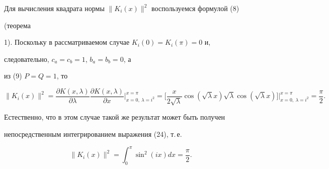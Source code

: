\begin{exam}
 


Для вычисления квадрата нормы $\|K_i(x)\|^2$ воспользуемся формулой (8) 


(теорема 


1). Поскольку в рассматриваемом случае $K_i(0)=K_i(\pi)=0$ и, 


следовательно, $c_a=c_b=1$, $b_a=b_b=0$, а 


из (9) $P=Q=1$, то 


$$ 


\|K_i(x)\|^2=\frac{\partial K(x,\lambda)}{\partial\lambda} 


\frac{\partial K(x,\lambda)}{\partial x} 


\bigg|^{x=\pi}_{x=0,\ \lambda=i^2}=\bigg[ 


\frac{x}{2\sqrt{\lambda}}\cos(\sqrt{\lambda}x)\sqrt{\lambda}\cos 


(\sqrt{\lambda}x)\bigg]\bigg|^{x=\pi}_{x=0,\ \lambda=i^2}= 


\frac{\pi}{2}.


$$ 


Естественно, что в этом случае такой же результат может быть получен 


непосредственным интегрированием выражения (24), т.\,е. 


$$ 


\|K_i(x)\|^2=\int^\pi_0\sin^2(ix)dx=\frac{\pi}{2}. 


$$ 


\end{exam} 


 


